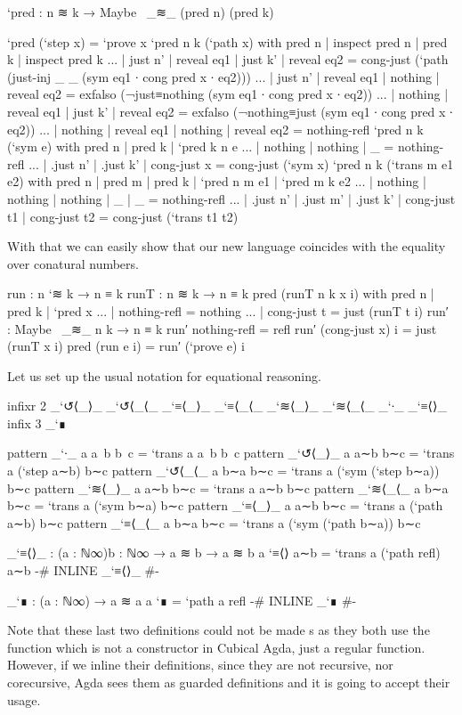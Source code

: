 \begin{code}
`pred : n ≋ k → Maybe~ _≋_ (pred n) (pred k)
\end{code}
\begin{code}[hide]
`pred (`step x) = `prove x
`pred {n} {k} (`path x) with pred n | inspect pred n | pred k | inspect pred k
... | just n' | reveal eq1 | just k' | reveal eq2 = cong-just (`path (just-inj _ _ (sym eq1 ∙ cong pred x ∙ eq2)))
... | just n' | reveal eq1 | nothing | reveal eq2 = exfalso (¬just≡nothing (sym eq1 ∙ cong pred x ∙ eq2))
... | nothing | reveal eq1 | just k' | reveal eq2 = exfalso (¬nothing≡just (sym eq1 ∙ cong pred x ∙ eq2))
... | nothing | reveal eq1 | nothing | reveal eq2 = nothing-refl
`pred {n} {k} (`sym e) with pred n | pred k | `pred {k} {n} e
... | nothing  | nothing  | _ = nothing-refl
... | .just n' | .just k' | cong-just x = cong-just (`sym x)
`pred {n} {k} (`trans {m} e1 e2) with pred n | pred m | pred k | `pred {n} {m} e1 | `pred {m} {k} e2
... | nothing  | nothing  | nothing  | _  | _  = nothing-refl
... | .just n' | .just m' | .just k' | cong-just t1 | cong-just t2 = cong-just (`trans t1 t2)
\end{code}

With that we can easily show that our new language coincides with the equality over conatural numbers.

\begin{code}
run : n `≋ k → n ≡ k
runT : n ≋ k → n ≡ k
pred (runT {n} {k} x i) with {pred n} | {pred k} | `pred x
... | nothing-refl = nothing
... | cong-just t = just (runT t i)
run′ : Maybe~ _≋_ n k → n ≡ k
run′ nothing-refl = refl
run′ (cong-just x) i = just (runT x i)
pred (run e i) = run′ (`prove e) i
\end{code}

Let us set up the usual notation for equational reasoning.

\begin{code}[hide]
infixr 2 _`↺⟨_⟩_ _`↺⟨_⟨_ _`≡⟨_⟩_ _`≡⟨_⟨_ _`≋⟨_⟩_ _`≋⟨_⟨_ _`∙_ _`≡⟨⟩_
infix  3 _`∎
\end{code}
\begin{code}
pattern _`∙_  {a} a~b b~c = `trans {a} a~b b~c
pattern _`↺⟨_⟩_ a a∼b b∼c = `trans {a} (`step a∼b) b∼c
pattern _`↺⟨_⟨_ a b∼a b∼c = `trans {a} (`sym (`step b∼a)) b∼c
pattern _`≋⟨_⟩_ a a∼b b∼c = `trans {a} a∼b b∼c
pattern _`≋⟨_⟨_ a b∼a b∼c = `trans {a} (`sym b∼a) b∼c
pattern _`≡⟨_⟩_ a a∼b b∼c = `trans {a} (`path a∼b) b∼c
pattern _`≡⟨_⟨_ a b∼a b∼c = `trans {a} (`sym (`path b∼a)) b∼c

_`≡⟨⟩_ : (a : ℕ∞){b : ℕ∞} → a ≋ b → a ≋ b
a `≡⟨⟩ a∼b = `trans {a} (`path refl) a∼b
{-# INLINE _`≡⟨⟩_ #-}

_`∎ : (a : ℕ∞) → a ≋ a
a `∎ = `path {a} refl
{-# INLINE _`∎ #-}
\end{code}

Note that these last two definitions could not be made s
as they both use the  function which is not a constructor
in Cubical Agda, just a regular function. However, if we inline their definitions,
since they are not recursive, nor corecursive, Agda sees them as guarded definitions
and it is going to accept their usage.
